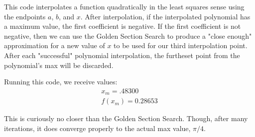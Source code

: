 \documentclass[11pt]{article}
\begin{document}
This code interpolates a function quadratically in the least squares sense
using the endpoints $a$, $b$, and $x$. After interpolation, if the interpolated
polynomial has a maximum value, the first coefficient is negative. If the first
coefficient is not negative, then we can use the Golden Section Search to produce
a "close enough" approximation for a new value of $x$ to be used for our third
interpolation point. After each "successful" polynomial interpolation, the
furtheset point from the polynomial's max will be discarded.

Running this code, we receive values:
\begin{eqnarray*}
	x_m = .48300 \\ f(x_m) = 0.28653
\end{eqnarray*}

This is curiously no closer than the Golden Section Search. Though, after many
iterations, it does converge properly to the actual max value, $\pi/4$.

\end{document}
